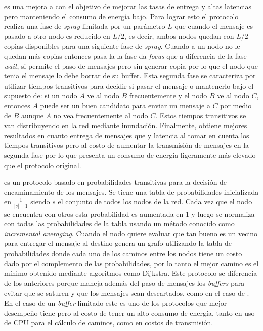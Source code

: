 \syf{} \cite{spyropoulos_spray_2007} es una mejora a \syw{} con el objetivo de
mejorar las tasas de entrega y altas latencias pero manteniendo el consumo de
energía bajo. Para lograr esto el protocolo realiza una fase de \textit{spray}
limitada por un parámetro $L$ que cuando el mensaje es pasado a otro nodo es
reducido en $L / 2$, es decir, ambos nodos quedan con $L / 2$ copias disponibles
para una siguiente fase de \textit{spray}. Cuando a un nodo no le quedan más
copias entonces pasa la la fase da \textit{focus} que a diferencia de la fase
\textit{wait}, si permite el paso de mensajes pero sin generar copia por lo que
el nodo que tenia el mensaje lo debe borrar de su buffer. Esta segunda fase se
caracteriza por utilizar tiempos transitivos para decidir si pasar el mensaje o
mantenerlo bajo el supuesto de: si un nodo $A$ ve al nodo $B$ frecuentemente y
el nodo $B$ ve al nodo $C$, entonces $A$ puede ser un buen candidato para enviar
un mensaje a $C$ por medio de $B$ aunque $A$ no vea frecuentemente al nodo
$C$. Estos tiempos transitivos se van distribuyendo en la red mediante
inundación. Finalmente, \syf{} obtiene mejores resultados en cuanto entrega de
mensajes que \syw{} y latencia al tomar en cuenta los tiempos transitivos pero
al costo de aumentar la transmisión de mensajes en la segunda fase por lo que
presenta un consumo de energía ligeramente más elevado que el protocolo
original.



\maxprop{} \cite{burgess_maxprop:_2006} es un protocolo basado en probabilidades
transitivas para la decisión de encaminamiento de los mensajes. Se tiene una
tabla de probabilidades inicializada en $\frac{1}{|s|-1}$  siendo $s$ el
conjunto de todos los nodos de la red.  Cada vez que el nodo se encuentra con
otros esta probabilidad es aumentada en 1 y luego se normaliza con todas las
probabilidades de la tabla usando un método conocido como \textit{incremental
averaging}. Cuando el nodo quiere evaluar que tan bueno es un vecino para
entregar el mensaje al destino genera un grafo utilizando la tabla de
probabilidades donde cada uno de los caminos entre los nodos tiene un costo dado
por el complemento de las probabilidades, por lo tanto el mejor camino es el
mínimo obtenido mediante algoritmos como Dijkstra. Este protocolo se diferencia
de los anteriores porque maneja además del paso de mensajes los \textit{buffers}
para evitar que se saturen y que los mensajes sean descartados, como en el caso
de \epidemic.  En el caso de un \textit{buffer} limitado este es uno de los
protocolos que mejor desempeño tiene pero al costo de tener un alto consumo de
energía, tanto en uso de CPU para el cálculo de caminos, como en costos de
transmisión.


